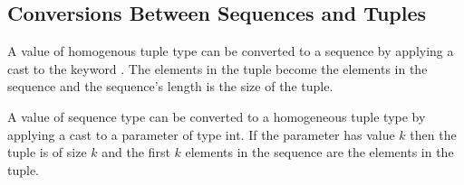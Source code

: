 \subsection{Conversions Between Sequences and Tuples}
\label{Conversions_Between_Sequences_and_Tuples}

A value of homogenous tuple type can be converted to a sequence by
applying a cast to the keyword .  The elements in the tuple
become the elements in the sequence and the sequence's length is the
size of the tuple.

A value of sequence type can be converted to a homogeneous tuple type
by applying a cast to a parameter of type int.  If the parameter has
value $k$ then the tuple is of size $k$ and the first $k$ elements in
the sequence are the elements in the tuple.
